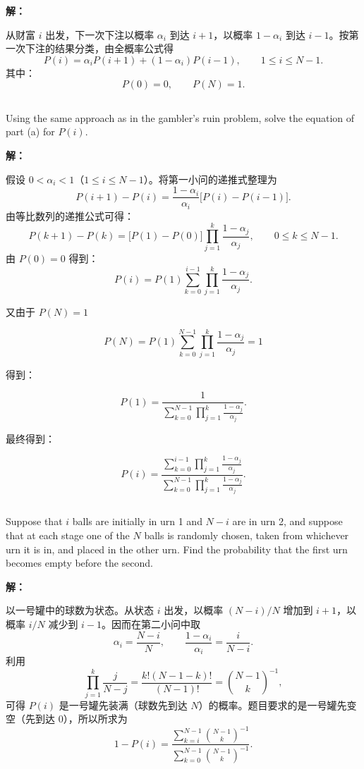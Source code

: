 \documentclass[12pt,a4paper]{article}
\begin{document}
\begin{answerbox}
\textbf{解：}

从财富 $i$ 出发，下一次下注以概率 $\alpha_i$ 到达 $i+1$，以概率 $1-\alpha_i$ 到达 $i-1$。按第一次下注的结果分类，由全概率公式得
\[
P(i)=\alpha_i P(i+1)+(1-\alpha_i)P(i-1),
\qquad 1\le i\le N-1.
\]
其中：
\[
P(0)=0,\qquad P(N)=1.
\]
\end{answerbox}

\subsection{}

Using the same approach as in the gambler's ruin problem, solve the equation of part (a) for $P(i)$.

\begin{answerbox}
\textbf{解：}

假设 $0<\alpha_i<1$（$1\le i\le N-1$）。将第一小问的递推式整理为
\[
P(i+1)-P(i)
=\frac{1-\alpha_i}{\alpha_i}\bigl[P(i)-P(i-1)\bigr].
\]
由等比数列的递推公式可得：
\[
P(k+1)-P(k)
=\bigl[P(1)-P(0)\bigr]
 \prod_{j=1}^{k}\frac{1-\alpha_j}{\alpha_j},
\qquad 0\le k\le N-1.
\]
由 $P(0)=0$ 得到：
\[
P(i)=P(1)\sum_{k=0}^{i-1}
\prod_{j=1}^{k}\frac{1-\alpha_j}{\alpha_j}.
\]

又由于 $P(N)=1$ 

\[
P(N)=P(1)\sum_{k=0}^{N-1}
\prod_{j=1}^{k}\frac{1-\alpha_j}{\alpha_j}=1
\]

得到：

$$
P(1) = \frac{1}
     {\sum_{k=0}^{N-1}
      \prod_{j=1}^{k}\frac{1-\alpha_j}{\alpha_j}}.
$$

最终得到：

\[
\displaystyle
P(i)=
\frac{\displaystyle\sum_{k=0}^{i-1}
      \prod_{j=1}^{k}\frac{1-\alpha_j}{\alpha_j}}
     {\displaystyle\sum_{k=0}^{N-1}
      \prod_{j=1}^{k}\frac{1-\alpha_j}{\alpha_j}}.
\]
\end{answerbox}

\subsection{}

 Suppose that $i$ balls are initially in urn 1 and $N-i$ are in urn 2, and suppose that at each stage one of the $N$ balls is randomly chosen, taken from whichever urn it is in, and placed in the other urn. Find the probability that the first urn becomes empty before the second.

\begin{answerbox}
\textbf{解：}

以一号罐中的球数为状态。从状态 $i$ 出发，以概率 $(N-i)/N$ 增加到 $i+1$，以概率 $i/N$ 减少到 $i-1$。因而在第二小问中取
\[
\alpha_i=\frac{N-i}{N},\qquad
\frac{1-\alpha_i}{\alpha_i}=\frac{i}{N-i}.
\]
利用
\[
\prod_{j=1}^{k}\frac{j}{N-j}
=\frac{k!(N-1-k)!}{(N-1)!}
=\binom{N-1}{k}^{-1},
\]
可得 $P(i)$ 是一号罐先装满（球数先到达 $N$）的概率。题目要求的是一号罐先变空（先到达 $0$），所以所求为
\[
\displaystyle
1-P(i)=
\frac{\displaystyle\sum_{k=i}^{N-1}\binom{N-1}{k}^{-1}}
     {\displaystyle\sum_{k=0}^{N-1}\binom{N-1}{k}^{-1}}.
\]
\end{answerbox}
\end{document}

